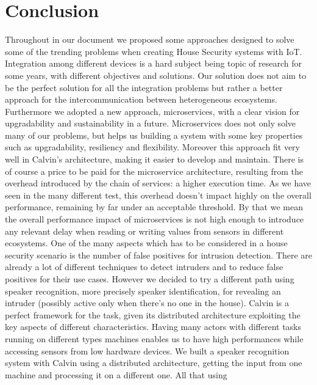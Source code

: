 \chapter{Conclusion}
\label{chap5}
Throughout in our document we proposed some approaches designed
to solve some of the trending problems when creating House Security systems
with IoT. \newline
Integration among different devices is a hard subject being topic of research
for some years, with different objectives and solutions. Our solution does not aim
to be the perfect solution for all the integration problems but rather
a better approach for the intercommunication between heterogeneous ecosystems.
Furthermore we adopted a new approach, microservices, with a clear vision for
upgradability and sustainability in a future. Microservices does not only
solve many of our problems, but helps us building a system with some key
properties such as upgradability, resiliency and flexibility. Moreover
this approach fit very well in Calvin's architecture, making it easier to develop
and maintain. There is of course a price to be paid for the microservice architecture,
resulting from the overhead introduced by the chain of services: a higher execution time.
As we have seen in the many different test, this overhead doesn't impact highly on the
overall performance, remaining by far under an acceptable threshold. By that we mean
the overall performance impact of microservices is not high enough to introduce
any relevant delay when reading or writing values from sensors in different
ecosystems.\newline
One of the many aspects which has to be considered in a house security scenario is the
number of false positives for intrusion detection. There are already a lot of different
techniques to detect intruders and to reduce false positives for their use cases.
However we decided to try a different path using speaker recognition, more precisely
speaker identification, for revealing an intruder (possibly active only when there's no one in the house).
Calvin is a perfect framework for the task, given its distributed architecture exploiting the
key aspects of different characteristics. Having many actors with different tasks
running on different types machines enables us to have high performances
while accessing sensors from low hardware devices.\newline
We built a speaker recognition system with Calvin using a distributed architecture,
getting the input from one machine and processing it on a different one. All that using
